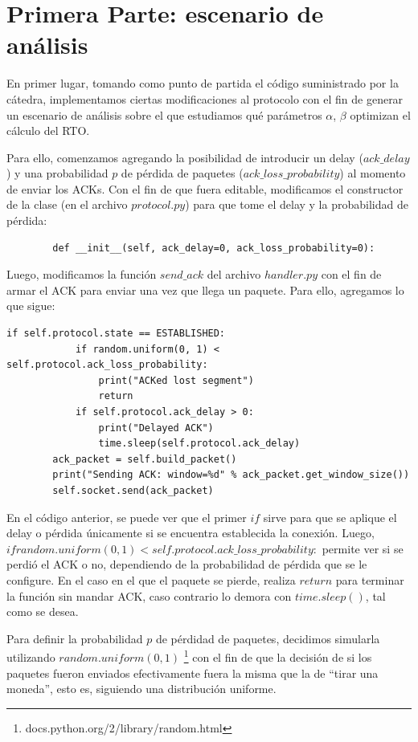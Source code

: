 \documentclass[10pt, a4paper]{article}
\begin{document}
\section{Primera Parte: escenario de análisis}

En primer lugar, tomando como punto de partida el código suministrado por la cátedra, implementamos ciertas modificaciones al protocolo con el fin de generar un escenario de análisis sobre el que estudiamos qué parámetros $\alpha$, $\beta$ optimizan el cálculo del RTO.

Para ello, comenzamos agregando la posibilidad de introducir un delay ($ack\_delay$) y una probabilidad $p$ de pérdida de paquetes ($ack\_loss\_probability$) al momento de enviar los ACKs. Con el fin de que fuera editable, modificamos el constructor de la clase (en el archivo $protocol.py$) para que tome el delay y la probabilidad de pérdida:
\begin{verbatim}
		def __init__(self, ack_delay=0, ack_loss_probability=0):
\end{verbatim}

Luego, modificamos la función $send\_ack$ del archivo $handler.py$ con el fin de armar el ACK para enviar una vez que llega un paquete. Para ello, agregamos lo que sigue:

\begin{verbatim}
if self.protocol.state == ESTABLISHED:
            if random.uniform(0, 1) < self.protocol.ack_loss_probability:
                print("ACKed lost segment")
                return
            if self.protocol.ack_delay > 0:
                print("Delayed ACK")
                time.sleep(self.protocol.ack_delay)
        ack_packet = self.build_packet()
        print("Sending ACK: window=%d" % ack_packet.get_window_size())
        self.socket.send(ack_packet)
\end{verbatim}
        
En el código anterior, se puede ver que el primer $if$ sirve para que se aplique el delay o pérdida únicamente si se encuentra establecida la conexión.
Luego, $if random.uniform(0, 1) < self.protocol.ack\_loss\_probability:$ permite ver si se perdió el ACK o no, dependiendo de la probabilidad de pérdida que se le configure. En el caso en el que el paquete se pierde, realiza $return$ para terminar la función sin mandar ACK, caso contrario lo demora con $time.sleep()$, tal como se desea.

Para definir la probabilidad $p$ de pérdidad de paquetes, decidimos simularla utilizando $random.uniform(0,1)$ \footnote{docs.python.org/2/library/random.html} con el fin de que la decisión de si los paquetes fueron enviados efectivamente fuera la misma que la de ``tirar una moneda'', esto es, siguiendo una distribución uniforme.
\end{document}
